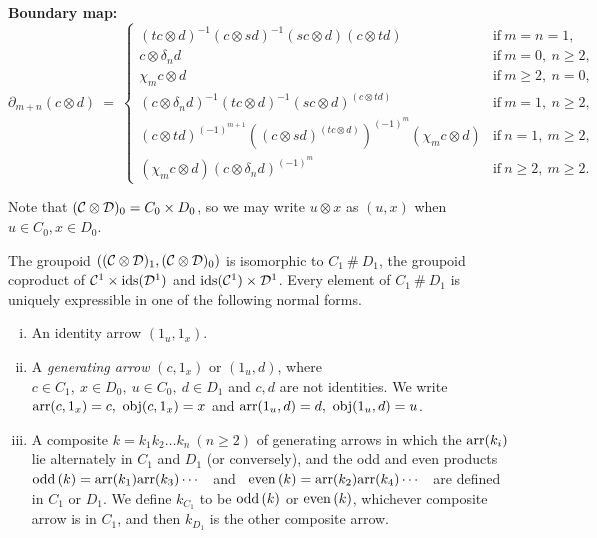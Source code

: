 \begin{defn}
\medskip\noindent
{\bf Boundary map:}
$$
\partial_{m+n}(c \otimes d) ~=~ 
  \left\{ \begin{array}{ll}
  (tc \otimes d)^{-1}(c \otimes sd)^{-1}(sc \otimes d)(c \otimes td) 
    & \text{if}~ m=n=1, \\
  c \otimes \delta_n d 
    & \text{if}~ m=0,~ n \geqslant 2, \\
  \chi_m c \otimes d 
    & \text{if}~ m \geqslant 2,~ n=0, \\
  (c \otimes \delta_n d)^{-1}(tc \otimes d)^{-1}(sc \otimes d)^{(c \otimes td)}
    & \text{if}~ m=1,~ n \geqslant 2, \\
  (c \otimes td)^{(-1)^{m+1}}
     \left((c \otimes sd)^{(tc \otimes d)}\right)^{(-1)^m}(\chi_m c \otimes d) 
    & \text{if}~ n=1,~ m \geqslant 2, \\
  (\chi_m c \otimes d)(c \otimes \delta_n d)^{(-1)^m} 
    & \text{if}~ n \geqslant 2,~ m \geqslant 2. 
  \end{array} \right.
$$
\end{defn}

\noindent
Note that $(\mathcal{C} \otimes \mathcal{D})_0 = C_0 \times D_0$, 
so we may write $u \otimes x$ as $(u,x)$ when $u \in C_0, x \in D_0$. 

\medskip 
The groupoid $((\mathcal{C} \otimes \mathcal{D})_1, (\mathcal{C} \otimes \mathcal{D})_0)$ 
is isomorphic to $C_1\ \#\ D_1$, the groupoid coproduct of 
$\mathcal{C}^1 \times \mathrm{ids}(\mathcal{D}^1)$ and $\mathrm{ids}(\mathcal{C}^1) \times \mathcal{D}^1$. 
Every element of $C_1\ \#\ D_1$ is uniquely expressible in one 
of the following normal forms. 
\begin{enumerate}[(i)] 
\item
An identity arrow $(1_u,1_x)$. 
\item
A \emph{generating arrow} $(c,1_x)$ or $(1_u,d)$, 
where $c \in C_1,~ x \in D_0,~ u \in C_0,~ d \in D_1$ 
and $c,d$ are not identities. 
We write $\mathrm{arr}(c,1_x)=c,~ \mathrm{obj}(c,1_x)=x$ and $\mathrm{arr}(1_u,d)=d,~\mathrm{obj}(1_u,d)=u$. 
\item
A composite $k=k_1k_2\ldots k_n~ (n \geqslant 2)$ of generating arrows 
in which the $\mathrm{arr}(k_i)$ lie alternately in $C_1$ and $D_1$ 
(or conversely), and the odd and even products 
~$\mathrm{odd}\,(k) = \mathrm{arr}(k_1)\mathrm{arr}(k_3)\cdots$~ 
and ~$\mathrm{even}\,(k) = \mathrm{arr}(k_2)\mathrm{arr}(k_4)\cdots$~ 
are defined in $C_1$ or $D_1$. 
We define $k_{C_1}$ to be $\mathrm{odd}\,(k)$ or $\mathrm{even}\,(k)$, 
whichever composite arrow is in $C_1$, 
and then $k_{D_1}$ is the other composite arrow. 
\end{enumerate} 



